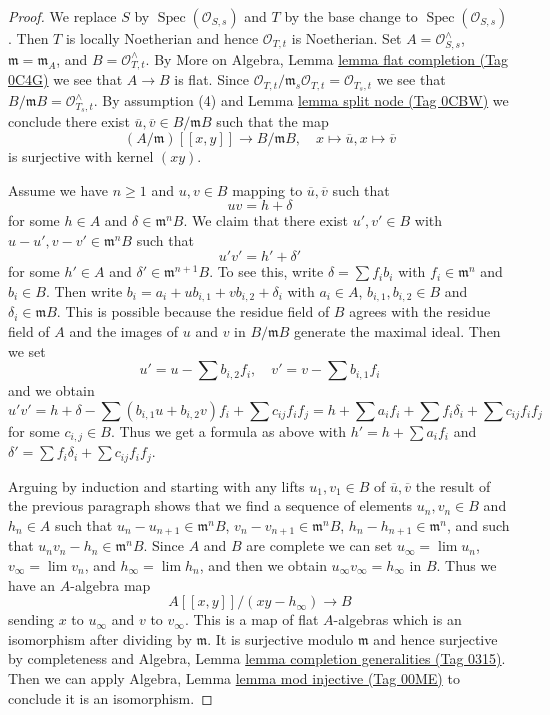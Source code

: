 \documentclass{amsart}
\theoremstyle{plain}
\theoremstyle{definition}
\theoremstyle{remark}
\numberwithin{equation}{subsection}
\def\lim{\mathop{\mathrm{lim}}\nolimits}
\def\Spec{\mathop{\mathrm{Spec}}}
\begin{document}
\begin{proof}
We replace $S$ by $\Spec(\mathcal{O}_{S, s})$ and $T$ by the base change
to $\Spec(\mathcal{O}_{S, s})$. Then $T$ is locally Noetherian and hence
$\mathcal{O}_{T, t}$ is Noetherian.
Set $A = \mathcal{O}_{S, s}^\wedge$, $\mathfrak m = \mathfrak m_A$, and
$B = \mathcal{O}_{T, t}^\wedge$. By
More on Algebra, Lemma \href{https://stacks.math.columbia.edu/tag/0C4G}{lemma flat completion (Tag 0C4G)}
we see that $A \to B$ is flat. Since
$\mathcal{O}_{T, t}/\mathfrak m_s \mathcal{O}_{T, t} = \mathcal{O}_{T_s, t}$
we see that $B/\mathfrak m B = \mathcal{O}_{T_s, t}^\wedge$.
By assumption (4) and Lemma \href{https://stacks.math.columbia.edu/tag/0CBW}{lemma split node (Tag 0CBW)}
we conclude there exist $\overline{u}, \overline{v} \in B/\mathfrak m B$
such that the map
$$
(A/\mathfrak m)[[x, y]] \longrightarrow B/\mathfrak m B,\quad
x \longmapsto \overline{u},
x \longmapsto \overline{v}
$$
is surjective with kernel $(xy)$.

\medskip\noindent
Assume we have $n \geq 1$ and $u, v \in B$ mapping to
$\overline{u}, \overline{v}$ such that
$$
u v = h + \delta
$$
for some $h \in A$ and $\delta \in \mathfrak m^nB$.
We claim that there exist $u', v' \in B$ with
$u - u', v - v' \in \mathfrak m^n B$ such that
$$
u' v' = h' + \delta'
$$
for some $h' \in A$ and $\delta' \in \mathfrak m^{n + 1}B$.
To see this, write $\delta = \sum f_i b_i$ with
$f_i \in \mathfrak m^n$ and $b_i \in B$. Then write
$b_i = a_i + u b_{i, 1} + v b_{i, 2} + \delta_i$ with
$a_i \in A$, $b_{i, 1}, b_{i, 2} \in B$ and $\delta_i \in \mathfrak m B$.
This is possible because the residue field of $B$ agrees with the
residue field of $A$ and the images of $u$ and $v$ in $B/\mathfrak m B$
generate the maximal ideal. Then we set
$$
u' = u - \sum b_{i, 2}f_i,\quad
v' = v - \sum b_{i, 1}f_i
$$
and we obtain
$$
u'v' = h + \delta - \sum (b_{i, 1}u + b_{i, 2}v)f_i + \sum
c_{ij}f_if_j =
h + \sum a_if_i + \sum f_i \delta_i + \sum c_{ij}f_if_j
$$
for some $c_{i, j} \in B$.
Thus we get a formula as above with $h' = h + \sum a_if_i$
and $\delta' = \sum f_i \delta_i + \sum c_{ij}f_if_j$.

\medskip\noindent
Arguing by induction and starting with any lifts $u_1, v_1 \in B$
of $\overline{u}, \overline{v}$ the result of the previous paragraph
shows that we find a sequence of elements
$u_n, v_n \in B$ and $h_n \in A$ such that
$u_n - u_{n + 1} \in \mathfrak m^n B$,
$v_n - v_{n + 1} \in \mathfrak m^n B$,
$h_n - h_{n + 1} \in \mathfrak m^n$,
and such that $u_n v_n - h_n \in \mathfrak m^n B$.
Since $A$ and $B$ are complete we can set
$u_\infty = \lim u_n$, $v_\infty = \lim v_n$,  and
$h_\infty = \lim h_n$, and then we obtain $u_\infty v_\infty = h_\infty$
in $B$. Thus we have an $A$-algebra map
$$
A[[x, y]]/(xy - h_\infty) \longrightarrow B
$$
sending $x$ to $u_\infty$ and $v$ to $v_\infty$.
This is a map of flat $A$-algebras which is an
isomorphism after dividing by $\mathfrak m$.
It is surjective modulo $\mathfrak m$ and hence surjective
by completeness and
Algebra, Lemma \href{https://stacks.math.columbia.edu/tag/0315}{lemma completion generalities (Tag 0315)}.
Then we can apply Algebra, Lemma \href{https://stacks.math.columbia.edu/tag/00ME}{lemma mod injective (Tag 00ME)}
to conclude it is an isomorphism.
\end{proof}
\end{document}

